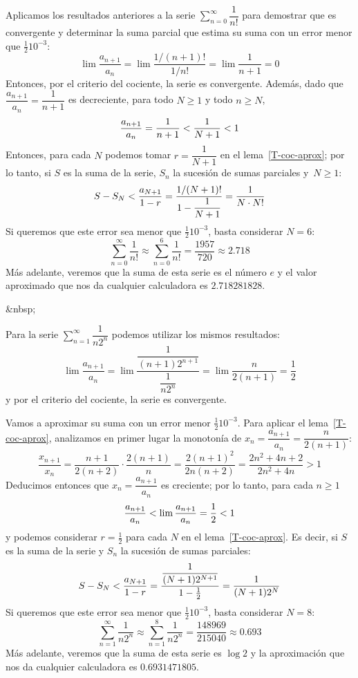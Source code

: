 \begin{ejemplo}
Aplicamos los resultados anteriores a la serie $\displaystyle\sum_{n=0}^\infty   \dfrac1{n!}$ para demostrar que es convergente y determinar la suma parcial que estima su suma con un error menor que $\frac1210^{-3}$:
\[
\lim\dfrac{a_{n+1}}{a_n}=\lim\dfrac{1/(n+1)!}{1/n!} = \lim \dfrac{1}{n+1} =0
\]
Entonces, por el criterio del cociente, la serie es convergente. Además, dado que $\dfrac{a_{n+1}}{a_n}=\dfrac1{n+1}$ es decreciente, para todo $N\ge1$ y todo $n\ge N$,
\[
\dfrac{a_{n+1}}{a_n}=\dfrac1{n+1} < \dfrac1{N+1} < 1
\]
Entonces, para cada $N$ podemos tomar $r=\dfrac1{N+1}$ en el lema~\ref{T-coc-aprox};
por lo tanto, si $S$ es la suma de la serie, $S_n$ la sucesión de sumas parciales
y~$N\ge1$:
\[
S-S_N < \dfrac{a_{N+1}}{1-r}=\dfrac{1/(N+1)!}{1-\dfrac1{N+1}} = \dfrac1{N\cdot N!} 
\]
Si queremos que este error sea menor que $\frac1210^{-3}$, basta considerar $N=6$:
\[
\displaystyle\sum_{n=0}^\infty   \dfrac1{n!}\approx\sum_{n=0}^{6} \dfrac1{n!} =\dfrac{1957}{720}\approx 2.718
\]
Más adelante, veremos que la suma de esta serie es el número $e$ y el valor aproximado que nos da cualquier calculadora es $2.718281828$.
\fej\end{ejemplo}
\begin{rawhtml}
&nbsp;
\end{rawhtml}
\begin{ejemplo}
Para la serie $\displaystyle\sum_{n=1}^\infty   \dfrac1{n2^n}$ podemos utilizar los mismos resultados:
\[
\lim\dfrac{a_{n+1}}{a_n}=
\lim\dfrac{\dfrac1{(n+1)2^{n+1}}}{\dfrac1{n2^n}} = \lim \dfrac{n}{2(n+1)} =\dfrac12
\]
y por el criterio del cociente, la serie es convergente.

Vamos a aproximar su suma con un error menor $\frac1210^{-3}$.
Para aplicar el lema~\ref{T-coc-aprox}, analizamos en primer lugar la monotonía de $x_n=\dfrac{a_{n+1}}{a_n}=\dfrac{n}{2(n+1)}$:
\[
\dfrac{x_{n+1}}{x_n} 
= \dfrac{n+1}{2(n+2)}\cdot\dfrac{2(n+1)}{n}
= \dfrac{2(n+1)^2}{2n(n+2)} = \dfrac{2n^2+4n+2}{2n^2+4n}>1
\]
Deducimos entonces que $x_n=\dfrac{a_{n+1}}{a_n}$ es creciente;
por lo tanto, para cada $n\ge 1$
\[
\dfrac{a_{n+1}}{a_n} < \lim \dfrac{a_{n+1}}{a_n} =\frac12 < 1
\]
y podemos considerar $r=\frac12$ para cada $N$ en el lema~\ref{T-coc-aprox}.
Es decir, si $S$ es la suma de la serie y $S_n$ la sucesión de sumas parciales:
\[
S-S_N < \dfrac{a_{N+1}}{1-r}=\dfrac{\dfrac1{(N+1)2^{N+1}}}{1-\frac12} = \dfrac1{(N+1)2^{N}}
\]
Si queremos que este error sea menor que $\frac1210^{-3}$, basta considerar $N=8$:
\[
\displaystyle\sum_{n=1}^\infty   \dfrac1{n2^n}\approx\sum_{n=1}^{8} \dfrac1{n2^n} =\dfrac{148969}{215040} \approx 0.693
\]
Más adelante, veremos que la suma de esta serie es $\log 2$ y la aproximación que nos da cualquier calculadora es $0.6931471805$.
\fej\end{ejemplo}

